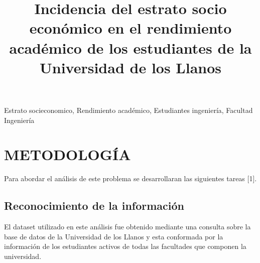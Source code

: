 \documentclass[conference]{IEEEtran}\usepackage[]{graphicx}\usepackage[]{color}
\begin{document}
	
	
	\title{Incidencia del estrato socio económico en el rendimiento académico de los estudiantes de la Universidad de los Llanos}
	
	\author{
	}
	\maketitle
	
	
	
	\begin{IEEEkeywords}
		Estrato socieconomico, Rendimiento académico, Estudiantes ingeniería, Facultad Ingeniería 
	\end{IEEEkeywords}
	
	
	

\section{METODOLOGÍA}



 Para abordar el análisis de este problema se desarrollaran las siguientes tareas [1].
 
  \subsection{Reconocimiento de la información}
 
 El dataset utilizado en este análisis fue obtenido mediante una consulta sobre la base de datos de la Universidad de los Llanos y esta conformada por la información de los estudiantes activos de todas las facultades que componen la universidad.
  
\end{document}
